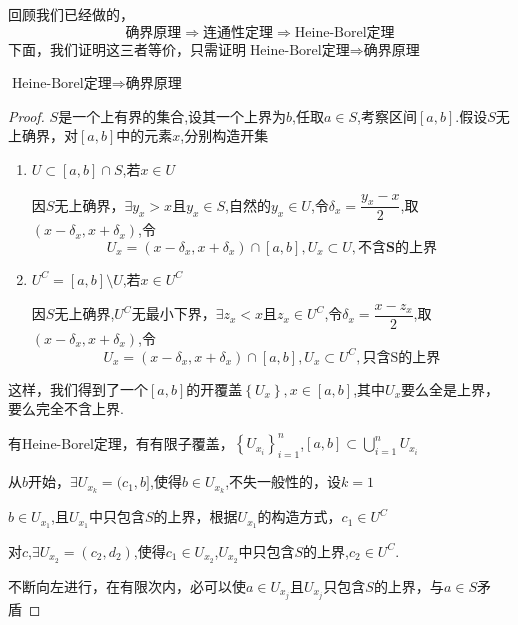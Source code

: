 回顾我们已经做的，
\[\text{确界原理}\Rightarrow\text{连通性定理}\Rightarrow\text{Heine-Borel定理}\]
下面，我们证明这三者等价，只需证明$\text{Heine-Borel定理}\Rightarrow\text{确界原理}$
\begin{theorem}
	$\text{Heine-Borel定理}\Rightarrow\text{确界原理}$
\end{theorem}
\begin{proof}
	$S$是一个上有界的集合,设其一个上界为$b$,任取$a\in S$,考察区间$\left[a,b\right]$.假设$S$无上确界，对$\left[a,b\right]$中的元素$x$,分别构造开集
	
	\begin{enumerate}
		\item$U\subset\left[a,b\right]\cap S$,若$x\in U$
		
		因$S$无上确界，$\exists y_x>x\textbf{且}y_x\in S$,自然的$y_x\in U$,令$\delta_x=\dfrac{y_x-x}{2}$,取$\left(x-\delta_x,x+\delta_x\right)$,令
		$$U_x=\left(x-\delta_x,x+\delta_x\right)\cap\left[a,b\right] ,U_x\subset U,\textbf{不含S的上界}$$
		
		\item$U^C=\left[a,b\right]\setminus U$,若$x\in U^C$
		
		因$S$无上确界,$U^C$无最小下界，$\exists z_x<x\textbf{且}z_x\in U^C$,令$\delta_x=\dfrac{x-z_x}{2}$,取$\left(x-\delta_x,x+\delta_x\right)$,令
		$$U_x=\left(x-\delta_x,x+\delta_x\right)\cap\left[a,b\right] ,U_x\subset U^C,\text{只含S的上界}$$
	\end{enumerate}
	这样，我们得到了一个$\left[a,b\right]$的开覆盖$\left\{U_x\right\},x\in\left[a,b\right]$,其中$U_x$要么全是上界，要么完全不含上界.
	
	有Heine-Borel定理，有有限子覆盖，$\left\{U_{x_i}\right\}_{i=1}^n$,$\left[a,b\right]\subset \bigcup_{i=1}^n U_{x_i}$
	
	从$b$开始，$\exists U_{x_k}=(c_1,b]$,使得$b\in U_{x_k}$,不失一般性的，设$k=1$
	
	$b\in U_{x_1}$,且$U_{x_1}$中只包含$S$的上界，根据$U_{x_1}$的构造方式，$c_1\in U^C$
	
	对$c$,$\exists U_{x_2}=\left(c_2,d_2\right)$,使得$c_1\in U_{x_2}$,$U_{x_2}$中只包含$S$的上界,$c_2\in U^C$.
	
	不断向左进行，在有限次内，必可以使$a\in U_{x_j}$且$U_{x_j}$只包含$S$的上界，与$a\in S$矛盾
\end{proof}














